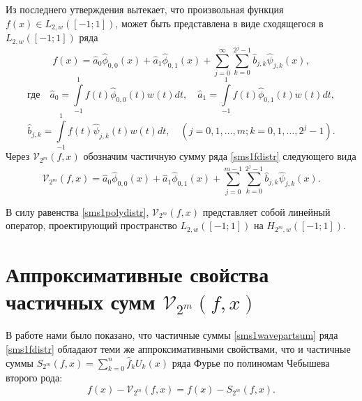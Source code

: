Из  последнего утверждения вытекает, что произвольная функция $f(x) \in L_{2, w}([-1; 1])$, может быть представлена в виде сходящегося в $L_{2, w}([-1; 1])$ ряда
\begin{equation}
\label{sms1fdistr}
f(x) = \hat{a}_{0}\hat{\phi}_{0,0}(x) + \hat{a}_{1}\hat{\phi}_{0,1}(x) + \sum\limits_{j=0}^{\infty} \sum\limits_{k=0}^{2^j-1} \hat{b}_{j,k}\hat{\psi}_{j,k}(x),
\end{equation}
\begin{equation*}
\label{sms1fcoeffA}
\text{где}\quad \hat{a}_{0} = \int\limits_{-1}^{1} f(t)\hat{\phi}_{0,0}(t)w(t)dt, \quad \hat{a}_{1} = \int\limits_{-1}^{1} f(t)\hat{\phi}_{0,1}(t)w(t)dt,
\end{equation*}
\begin{equation*}
\label{sms1fcoeffB}
\hat{b}_{j,k} = \int\limits_{-1}^{1} f(t)\hat{\psi}_{j,k}(t)w(t)dt, \quad (j=0,1, \ldots, m; k = 0, 1, \ldots, 2^j-1).
\end{equation*}
Через $\mathcal{V}_{2^m}(f,x)$ обозначим частичную сумму ряда \eqref{sms1fdistr} следующего вида
\begin{equation}
\label{sms1wavepartsum}
\mathcal{V}_{2^m}(f,x) = \hat{a}_{0}\hat{\phi}_{0,0}(x) + \hat{a}_{1}\hat{\phi}_{0,1}(x) + \sum\limits_{j=0}^{m-1} \sum\limits_{k=0}^{2^j-1} \hat{b}_{j,k}\hat{\psi}_{j,k}(x).
\end{equation}

\begin{remark} \label{sms_remark_1}
В силу равенства \eqref{sms1polydistr}, $\mathcal{V}_{2^m}(f, x)$ представляет собой линейный оператор, проектирующий пространство $L_{2, w}([-1; 1])$ на $H_{2^m, w}([-1; 1])$.
\end{remark}


\section{Аппроксимативные свойства частичных сумм $\mathcal{V}_{2^m}(f,x)$}

В работе \cite{sms11}
нами было показано, что частичные суммы \eqref{sms1wavepartsum} ряда \eqref{sms1fdistr} обладают теми же аппроксимативными свойствами, что и частичные суммы $S_{2^{m}}(f,x) = \sum_{k=0}^{n} \hat{f}_k U_k(x)$ ряда Фурье по полиномам Чебышева второго рода:
\begin{equation}
\label{sms1approxprops}
f(x) - \mathcal{V}_{2^m}(f,x) = f(x) - S_{2^{m}}(f,x).
\end{equation}

